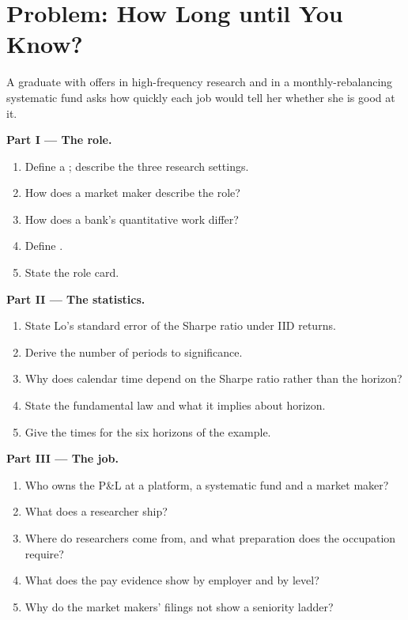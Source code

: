 \section{Problem: How Long until You Know?}

\begin{problem}\label{pb:in:quant-researcher:1}
A graduate with offers in high-frequency research and in a monthly-rebalancing systematic fund asks how quickly each job
would tell her whether she is good at it.

\medskip\noindent\textbf{Part I --- The role.}
\begin{enumerate}
\item Define a ; describe the three research settings.
\item How does a market maker describe the role?
\item How does a bank's quantitative work differ?
\item Define .
\item State the role card.
\end{enumerate}

\medskip\noindent\textbf{Part II --- The statistics.}
\begin{enumerate}[resume]
\item State Lo's standard error of the Sharpe ratio under IID returns.
\item Derive the number of periods to significance.
\item Why does calendar time depend on the Sharpe ratio rather than the horizon?
\item State the fundamental law and what it implies about horizon.
\item Give the times for the six horizons of the example.
\end{enumerate}

\medskip\noindent\textbf{Part III --- The job.}
\begin{enumerate}[resume]
\item Who owns the P\&L at a platform, a systematic fund and a market maker?
\item What does a researcher ship?
\item Where do researchers come from, and what preparation does the occupation require?
\item What does the pay evidence show by employer and by level?
\item Why do the market makers' filings not show a seniority ladder?
\end{enumerate}


\end{problem}
